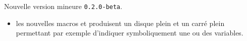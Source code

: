 Nouvelle version mineure \verb+0.2.0-beta+.

\begin{itemize}[itemsep=.5em]
    \item {} les nouvelles macros  et  produisent un disque plein et un carré plein permettant par exemple d'indiquer symboliquement une ou des variables.
    
    \separation
\end{itemize}